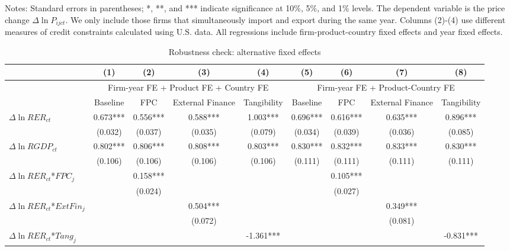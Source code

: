 \documentclass[12pt]{article}
\begin{document}
\begin{table}
\begin{threeparttable}
		\begin{tablenotes}
			\footnotesize
			\item[Notes:] Standard errors in parentheses; *, **, and *** indicate significance at 10\%, 5\%, and 1\% levels. The dependent variable is the price change $\Delta \ln P_{ijct}$. We only include those firms that simultaneously import and export during the same year. Columns (2)-(4) use different measures of credit constraints calculated using U.S. data. All regressions include firm-product-country fixed effects and year fixed effects.
		\end{tablenotes}
	\end{threeparttable}
	\label{tab.robust.tradetype}
\end{table}

\begin{table}
	\centering
	\caption{Robustness check: alternative fixed effects}
	\begin{threeparttable}
		\begin{tabular}{lcccccccc}
			\toprule
			& (1)   & (2)   & (3)   & (4) &  (5)  &  (6)  & (7)  & (8)\\
			\midrule
			& \multicolumn{4}{c}{Firm-year FE + Product FE + Country FE} & \multicolumn{4}{c}{Firm-year FE + Product-Country FE}\\
			& Baseline & FPC   & External Finance & Tangibility & Baseline & FPC & External Finance & Tangibility\\
			\midrule
			$\Delta \ln RER_{ct}$ & 0.673*** & 0.556*** & 0.588*** & 1.003*** & 0.696*** & 0.616*** & 0.635*** & 0.896*** \\
			& (0.032) & (0.037) & (0.035) & (0.079) & (0.034) & (0.039) & (0.036) & (0.085)\\
			$\Delta \ln RGDP_{ct}$ & 0.802*** & 0.806*** & 0.808*** & 0.803*** & 0.830*** & 0.832*** & 0.833*** & 0.830***\\
			& (0.106) & (0.106) & (0.106) & (0.106) & (0.111) & (0.111) & (0.111) & (0.111)\\
			$\Delta \ln RER_{ct}$*$FPC_{j}$ &       & 0.158*** &       &  && 0.105*** &&\\
			&       & (0.024) &       &  &&(0.027)&&\\
			$\Delta \ln RER_{ct}$*$ExtFin_{j}$ &       &       & 0.504*** &  &&  &0.349***&\\
			&       &       & (0.072) &  &&&(0.081)&\\
			$\Delta \ln RER_{ct}$*$Tang_{j}$ &       &       &      & -1.361*** &&&&-0.831***\\

\end{tabular}
\end{threeparttable}
\end{table}
\end{document}
